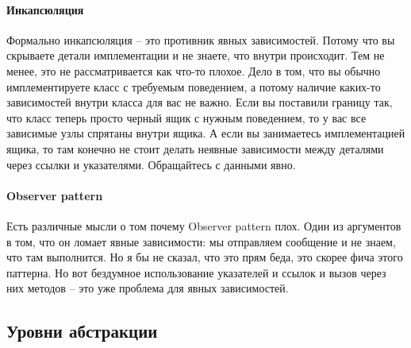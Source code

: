 \paragraph{Инкапсюляция}

Формально инкапсюляция -- это противник явных зависимостей.
Потому что вы скрываете детали имплементации и не знаете, что внутри происходит.
Тем не менее, это не рассматривается как что-то плохое.
Дело в том, что вы обычно имплементируете класс с требуемым поведением, а потому наличие каких-то зависимостей внутри класса для вас не важно.
Если вы поставили границу так, что класс теперь просто черный ящик с нужным поведением, то у вас все зависимые узлы спрятаны внутри ящика.
А если вы занимаетесь имплементацией ящика, то там конечно не стоит делать неявные зависимости между деталями через ссылки и указателями.
Обращайтесь с данными явно.

\paragraph{Observer pattern}

Есть различные мысли о том почему Observer pattern плох.
Один из аргументов в том, что он ломает явные зависимости: мы отправляем сообщение и не знаем, что там выполнится.
Но я бы не сказал, что это прям беда, это скорее фича этого паттерна.
Но вот бездумное использование указателей и ссылок и вызов через них методов -- это уже проблема для явных зависимостей.

\subsection{Уровни абстракции}
\label{section::AbstractionLevels}

